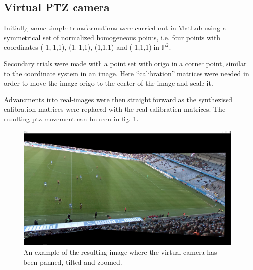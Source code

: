 \subsection{Virtual PTZ camera}
Initially, some simple transformations were carried out in MatLab using a symmetrical set of normalized homogeneous points, i.e. four points with coordinates (-1,-1,1), (1,-1,1), (1,1,1) and (-1,1,1) in $\mathbb{P}^2$.

Secondary trials were made with a point set with origo in a corner point, similar to the coordinate system in an image. Here ``calibration'' matrices were needed in order to move the image origo to the center of the image and scale it.

Advancments into real-images were then straight forward as the synthezised calibration matrices were replaced with the real calibration matrices.
The resulting ptz movement can be seen in fig. \ref{fig:ptz_res}.

\begin{figure}[H]
	\centering
	\includegraphics[width=0.8\columnwidth]{../results/images/PTZ_res.PNG}
	\caption{An example of the resulting image where the virtual camera has been panned, tilted and zoomed.}
	\label{fig:ptz_res}
\end{figure}
